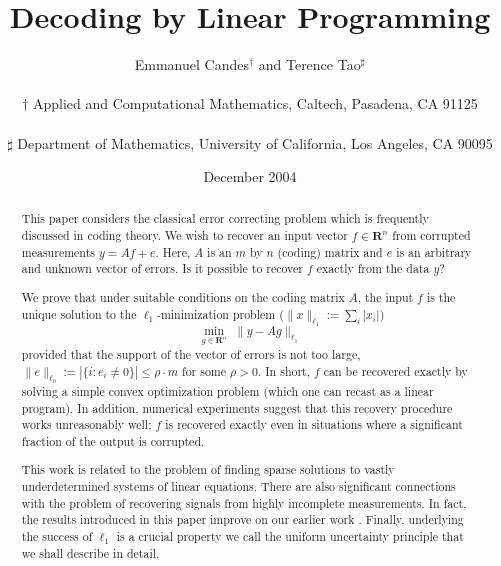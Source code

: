 \documentclass[11pt]{article}
\def\R{{{\mathbf{R}}}} %
\newcommand{\<}{\langle}
\renewcommand{\>}{\rangle}
\numberwithin{equation}{section}
\begin{document}
\title{Decoding by Linear Programming}

\author{Emmanuel Candes$^{\dagger}$ and Terence Tao$^{\sharp}$\\
  \vspace{-.3cm}\\
  $\dagger$ 
Applied and Computational Mathematics, Caltech, Pasadena, CA 91125\\
  \vspace{-.3cm}\\
  $\sharp$ 
Department of Mathematics, University of California, Los Angeles, CA 90095
} %

\date{December 2004} 

\maketitle

\begin{abstract}  
  
  
  This paper considers the classical error correcting problem which is
  frequently discussed in coding theory. We wish to recover an input
  vector $f \in \R^n$ from corrupted measurements $y = A f + e$. Here,
  $A$ is an $m$ by $n$ (coding) matrix and $e$ is an arbitrary and
  unknown vector of errors. Is it possible to recover $f$ exactly from
  the data $y$?
  
  We prove that under suitable conditions on the coding matrix $A$,
  the input $f$ is the unique solution to the $\ell_1$-minimization
  problem ($\|x\|_{\ell_1} := \sum_i |x_i|$)
  $$  
  \min_{g \in \R^n} \,\, \| y - Ag \|_{\ell_1} 
  $$
  provided that the support of the vector of errors is not too
  large, $\|e\|_{\ell_0} := |\{i : e_i \neq 0\}| \le \rho \cdot m$ for
  some $\rho > 0$. In short, $f$ can be recovered exactly by solving a
  simple convex optimization problem (which one can recast as a linear
  program).  In addition, numerical experiments suggest that this
  recovery procedure works unreasonably well; $f$ is recovered exactly
  even in situations where a significant fraction of the output is corrupted.
  
  This work is related to the problem of finding sparse solutions to
  vastly underdetermined systems of linear equations. There are also
  significant connections with the problem of recovering signals from
  highly incomplete measurements. In fact, the results introduced in
  this paper improve on our earlier work \cite{OptimalRecovery}.
  Finally, underlying the success of $\ell_1$ is a crucial property we
  call the uniform uncertainty principle that we shall describe in
  detail.

\end{abstract}
\end{document}
